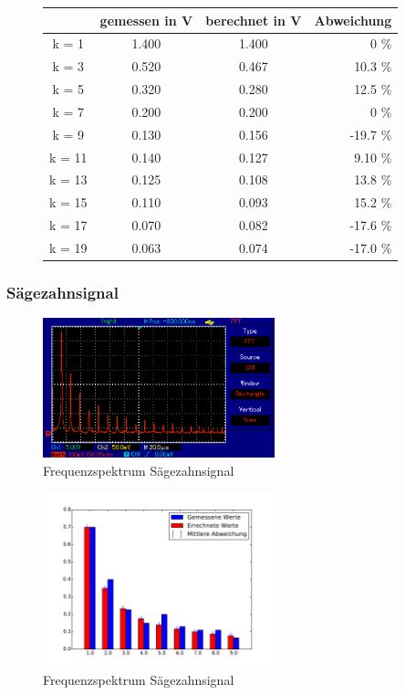\begin{figure}[h!]
	\centering
	\begin{tabular}{c|ccr}
		& gemessen in V & berechnet in V & Abweichung \\
		\hline
		k = 1 & 1.400   & 1.400       &  0   \%      \\
		k = 3 & 0.520  & 0.467 &  10.3 \%  \\
		k = 5 & 0.320  & 0.280      &  12.5  \%    \\
		k = 7 & 0.200   & 0.200       &  0  \%        \\
		k = 9 & 0.130  & 0.156  & -19.7 \%  \\
		k = 11 & 0.140  & 0.127  &  9.10 \% \\
		k = 13 & 0.125 & 0.108  &  13.8 \%  \\
		k = 15 & 0.110  & 0.093 &  15.2 \% \\
		k = 17 & 0.070  & 0.082 & -17.6 \%  \\
		k = 19 & 0.063 & 0.074 & -17.0 \% \\
	\end{tabular}
	\label{tab:Rechteck}
\end{figure}




\subsubsection{Sägezahnsignal}
\begin{figure}[h!]
	\centering
	\includegraphics[width=0.6\textwidth]{Saegezahn.png}
	\caption{Frequenzspektrum Sägezahnsignal}
	\label{Frequenz_Saege}
\end{figure}

\begin{figure}[h!]
	\centering
	\includegraphics[width=0.6\textwidth]{Saegezahn_Fourier.pdf}
	\caption{Frequenzspektrum Sägezahnsignal}
	\label{Fourier_Saege}
\end{figure}

